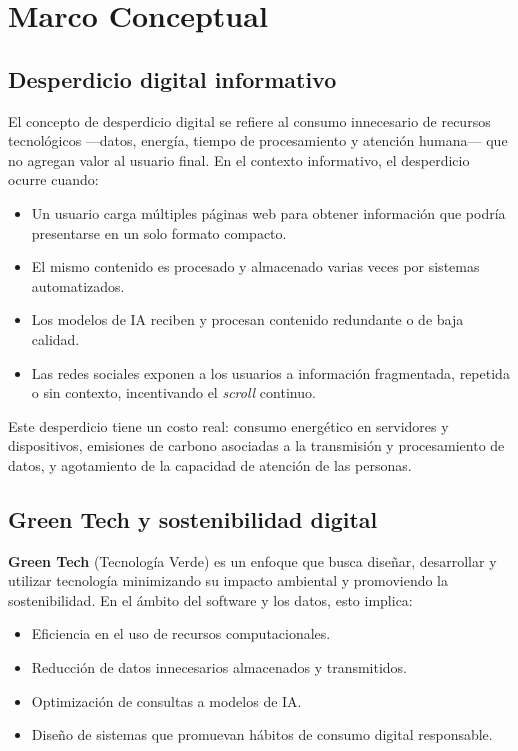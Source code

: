 \chapter{Marco Conceptual}

\section{Desperdicio digital informativo}

El concepto de desperdicio digital se refiere al consumo innecesario de recursos tecnol\'ogicos ---datos, energ\'ia, tiempo de procesamiento y atenci\'on humana--- que no agregan valor al usuario final. En el contexto informativo, el desperdicio ocurre cuando:

\begin{itemize}[nosep]
    \item Un usuario carga m\'ultiples p\'aginas web para obtener informaci\'on que podr\'ia presentarse en un solo formato compacto.
    \item El mismo contenido es procesado y almacenado varias veces por sistemas automatizados.
    \item Los modelos de IA reciben y procesan contenido redundante o de baja calidad.
    \item Las redes sociales exponen a los usuarios a informaci\'on fragmentada, repetida o sin contexto, incentivando el \textit{scroll} continuo.
\end{itemize}

Este desperdicio tiene un costo real: consumo energ\'etico en servidores y dispositivos, emisiones de carbono asociadas a la transmisi\'on y procesamiento de datos, y agotamiento de la capacidad de atenci\'on de las personas.

\section{Green Tech y sostenibilidad digital}

\textbf{Green Tech} (Tecnolog\'ia Verde) es un enfoque que busca dise\~nar, desarrollar y utilizar tecnolog\'ia minimizando su impacto ambiental y promoviendo la sostenibilidad. En el \'ambito del software y los datos, esto implica:

\begin{itemize}[nosep]
    \item Eficiencia en el uso de recursos computacionales.
    \item Reducci\'on de datos innecesarios almacenados y transmitidos.
    \item Optimizaci\'on de consultas a modelos de IA.
    \item Dise\~no de sistemas que promuevan h\'abitos de consumo digital responsable.
\end{itemize}

